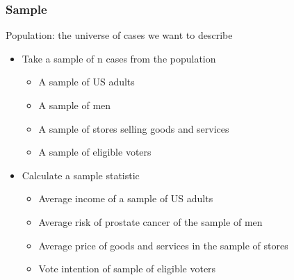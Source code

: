 \documentclass{beamer}
\begin{document}
\begin{frame}
 \frametitle<+->{Sample}
 Population: the \alert{universe of cases} we want to describe
 \begin{itemize}[<+->]
   \item Take a \alert{sample} of n cases from the population
      \begin{itemize}
        \item A sample of US adults
        \item A sample of men
        \item A sample of stores selling goods and services
        \item A sample of eligible voters
      \end{itemize}   
   \item Calculate a \alert{sample statistic}
      \begin{itemize}
        \item Average income of a sample of US adults
        \item Average risk of prostate cancer of the sample of men
        \item Average price of goods and services in the sample of stores
        \item Vote intention of sample of eligible voters
      \end{itemize}
 \end{itemize}
\end{frame}
\end{document}
